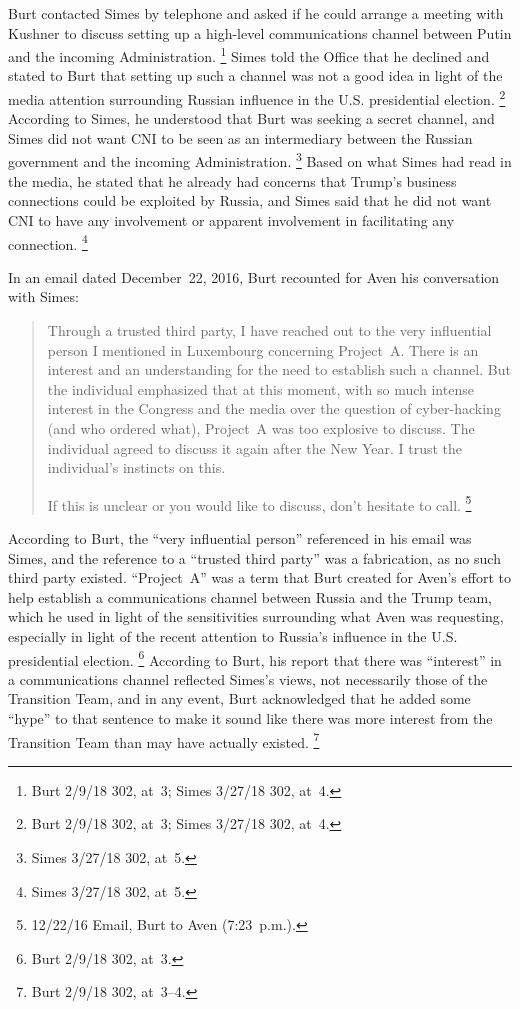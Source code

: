 Burt contacted Simes by telephone and asked if he could arrange a meeting with Kushner to discuss setting up a high-level communications channel between Putin and the incoming Administration.%
\footnote{Burt 2/9/18 302, at~3;
Simes 3/27/18 302, at~4.}
Simes told the Office that he declined and stated to Burt that setting up such a channel was not a good idea in light of the media attention surrounding Russian influence in the U.S. presidential election.%
\footnote{Burt 2/9/18 302, at~3;
Simes 3/27/18 302, at~4.}
According to Simes, he understood that Burt was seeking a secret channel, and Simes did not want CNI to be seen as an intermediary between the Russian government and the incoming Administration.%
\footnote{Simes 3/27/18 302, at~5.}
Based on what Simes had read in the media, he stated that he already had concerns that Trump's business connections could be exploited by Russia, and Simes said that he did not want CNI to have any involvement or apparent involvement in facilitating any connection.%
\footnote{Simes 3/27/18 302, at~5.}

In an email dated December~22, 2016, Burt recounted for Aven his conversation with Simes:

\begin{quote}
Through a trusted third party, I have reached out to the very influential person I mentioned in Luxembourg concerning Project~A\null.
There is an interest and an understanding for the need to establish such a channel.
But the individual emphasized that at this moment, with so much intense interest in the Congress and the media over the question of cyber-hacking (and who ordered what), Project~A was too explosive to discuss.
The individual agreed to discuss it again after the New Year.
I trust the individual's instincts on this.

If this is unclear or you would like to discuss, don't hesitate to call.%
\footnote{12/22/16 Email, Burt to Aven (7:23~p.m.).}
\end{quote}

According to Burt, the ``very influential person'' referenced in his email was Simes, and the reference to a ``trusted third party'' was a fabrication, as no such third party existed.
``Project~A'' was a term that Burt created for Aven's effort to help establish a communications channel between Russia and the Trump team, which he used in light of the sensitivities surrounding what Aven was requesting, especially in light of the recent attention to Russia's influence in the U.S. presidential election.%
\footnote{Burt 2/9/18 302, at~3.}
According to Burt, his report that there was ``interest'' in a communications channel reflected Simes's views, not necessarily those of the Transition Team, and in any event, Burt acknowledged that he added some ``hype'' to that sentence to make it sound like there was more interest from the Transition Team than may have actually existed.%
\footnote{Burt 2/9/18 302, at~3--4.}

